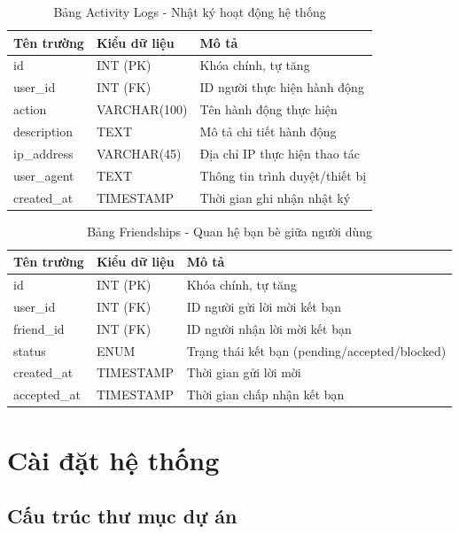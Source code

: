 \documentclass[13pt,a4paper]{extreport}
\begin{document}
\begin{table}[H]
\centering
\caption{Bảng Activity Logs - Nhật ký hoạt động hệ thống}
\begin{tabular}{|l|l|l|}
\hline
\textbf{Tên trường} & \textbf{Kiểu dữ liệu} & \textbf{Mô tả} \\
\hline
id & INT (PK) & Khóa chính, tự tăng \\
user\_id & INT (FK) & ID người thực hiện hành động \\
action & VARCHAR(100) & Tên hành động thực hiện \\
description & TEXT & Mô tả chi tiết hành động \\
ip\_address & VARCHAR(45) & Địa chỉ IP thực hiện thao tác \\
user\_agent & TEXT & Thông tin trình duyệt/thiết bị \\
created\_at & TIMESTAMP & Thời gian ghi nhận nhật ký \\
\hline
\end{tabular}
\end{table}

\begin{table}[H]
\centering
\caption{Bảng Friendships - Quan hệ bạn bè giữa người dùng}
\begin{tabular}{|l|l|l|}
\hline
\textbf{Tên trường} & \textbf{Kiểu dữ liệu} & \textbf{Mô tả} \\
\hline
id & INT (PK) & Khóa chính, tự tăng \\
user\_id & INT (FK) & ID người gửi lời mời kết bạn \\
friend\_id & INT (FK) & ID người nhận lời mời kết bạn \\
status & ENUM & Trạng thái kết bạn (pending/accepted/blocked) \\
created\_at & TIMESTAMP & Thời gian gửi lời mời \\
accepted\_at & TIMESTAMP & Thời gian chấp nhận kết bạn \\
\hline
\end{tabular}
\end{table}

\section{Cài đặt hệ thống}

\subsection{Cấu trúc thư mục dự án}
\end{document}
